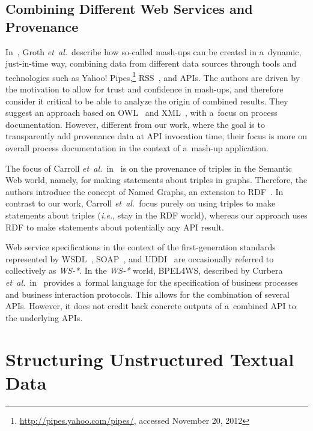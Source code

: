 \subsection{Combining Different Web Services and Provenance}

In~\cite{groth2009mashups}, Groth \emph{et~al.}\ describe
how so-called mash-ups can be created in a~dynamic,
just-in-time way, combining data from different data sources
through tools and technologies such as
Yahoo! Pipes,\footnote{\url{http://pipes.yahoo.com/pipes/},
accessed November 20, 2012}
RSS~\cite{cadenhead2006rss}, and APIs.
The authors are driven by the motivation to allow for trust
and confidence in mash-ups, and therefore
consider it critical to be able to analyze the origin
of combined results.
They suggest an approach based on OWL~\cite{mcguinness2004owl}
and XML~\cite{bray2008xml},
with a~focus on process documentation.
However, different from our work, where the goal is to transparently
add provenance data at API invocation time,
their focus is more on overall process documentation
in the context of a~mash-up application.

The focus of Carroll \emph{et~al.}\ in~\cite{carroll2005namedgraphs}
is on the provenance of triples in the Semantic Web world, namely,
for making statements about triples in graphs.
Therefore, the authors introduce the concept of Named Graphs,
an extension to RDF~\cite{klyne2004rdf}.
In contrast to our work, Carroll \emph{et~al.}\ focus
purely on using triples to make statements about triples
(\emph{i.e.}, stay in the RDF world),
whereas our approach uses RDF to make statements
about potentially any API result.
 
Web service specifications in the context of the 
first-generation standards represented by WSDL~\cite{christensen2001wsdl},
SOAP~\cite{gudgin2007soap}, and UDDI~\cite{sabbouh2001uddi}
are occasionally referred to collectively as \emph{WS-*}.
In the \emph{WS-*} world, BPEL4WS, described by
Curbera \emph{et~al.}\ in~\cite{curbera2003bpel4ws}
provides a~formal language for the specification of
business processes and business interaction protocols.
This allows for the combination of several APIs.
However, it does not credit back concrete outputs of a~combined API
to the underlying APIs.

\section{Structuring Unstructured Textual Data} 
\label{sec:structuring}

